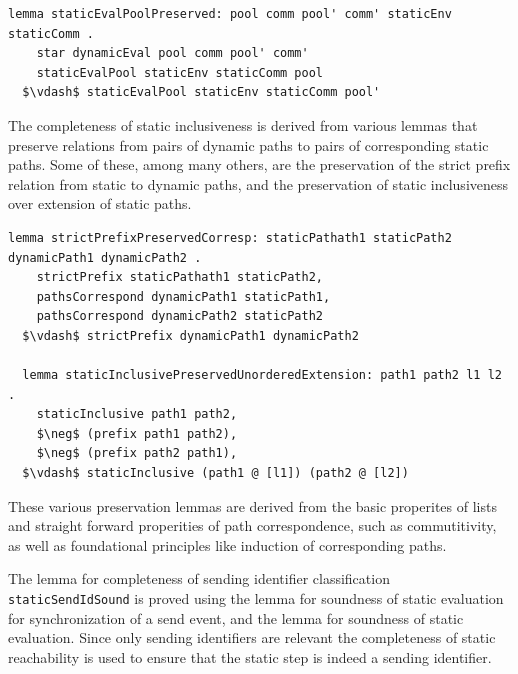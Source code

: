 \documentclass[letterpaper, 11pt]{extarticle}
\begin{document}
\begin{lstlisting}[language=logic, mathescape]
  lemma staticEvalPoolPreserved: pool comm pool' comm' staticEnv staticComm .
    star dynamicEval pool comm pool' comm' 
    staticEvalPool staticEnv staticComm pool
  $\vdash$ staticEvalPool staticEnv staticComm pool'
\end{lstlisting}

The completeness of static inclusiveness is derived from various lemmas that
preserve relations from pairs of dynamic paths to pairs of corresponding static paths. 
Some of these, among many others, are
the preservation of the strict prefix relation from static to dynamic paths,
and the preservation of static inclusiveness over extension of static paths.

\begin{lstlisting}[language=logic, mathescape]
  lemma strictPrefixPreservedCorresp: staticPathath1 staticPath2 dynamicPath1 dynamicPath2 .
    strictPrefix staticPathath1 staticPath2, 
    pathsCorrespond dynamicPath1 staticPath1,
    pathsCorrespond dynamicPath2 staticPath2
  $\vdash$ strictPrefix dynamicPath1 dynamicPath2

  lemma staticInclusivePreservedUnorderedExtension: path1 path2 l1 l2 .
    staticInclusive path1 path2, 
    $\neg$ (prefix path1 path2),
    $\neg$ (prefix path2 path1), 
  $\vdash$ staticInclusive (path1 @ [l1]) (path2 @ [l2])
\end{lstlisting}

These various preservation lemmas are derived from the basic properites of lists 
and straight forward properities of path correspondence, such as commutitivity, as
well as foundational principles like induction of corresponding paths.

The lemma for completeness of sending identifier classification \lstinline{staticSendIdSound}
is proved using the lemma for
soundness of static evaluation for synchronization of a send event,
and the lemma for soundness of static evaluation.
Since only sending identifiers are relevant the completeness of static reachability is
used to ensure that the static step is indeed a sending identifier. 
\end{document}
